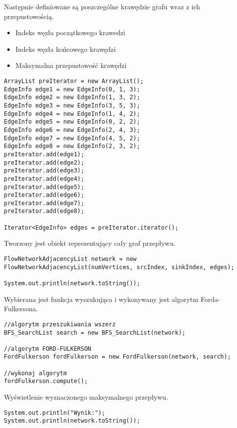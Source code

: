 \documentclass[10pt]{dokument-tiwo}
\begin{document}
Następnie definiowane są poszczególne krawędzie grafu wraz z ich przepustowością.
\begin{itemize}
\item Indeks węzła początkowego krawedzi
\item Indeks węzła końcowego krawędzi
\item Maksymalna przepustowość krawędzi
\end{itemize}
\begin{lstlisting}
ArrayList preIterator = new ArrayList();
EdgeInfo edge1 = new EdgeInfo(0, 1, 3);
EdgeInfo edge2 = new EdgeInfo(1, 3, 2);
EdgeInfo edge3 = new EdgeInfo(3, 5, 3);
EdgeInfo edge4 = new EdgeInfo(1, 4, 2);
EdgeInfo edge5 = new EdgeInfo(0, 2, 2);
EdgeInfo edge6 = new EdgeInfo(2, 4, 3);
EdgeInfo edge7 = new EdgeInfo(4, 5, 2);
EdgeInfo edge8 = new EdgeInfo(2, 3, 2);
preIterator.add(edge1);
preIterator.add(edge2);
preIterator.add(edge3);
preIterator.add(edge4);
preIterator.add(edge5);
preIterator.add(edge6);
preIterator.add(edge7);
preIterator.add(edge8);

Iterator<EdgeInfo> edges = preIterator.iterator();
\end{lstlisting}

Tworzony jest obiekt reprezentujący cały graf przepływu.
\begin{lstlisting}
FlowNetworkAdjacencyList network = new FlowNetworkAdjacencyList(numVertices, srcIndex, sinkIndex, edges);

System.out.println(network.toString());
\end{lstlisting}

Wybierana jest funkcja wyszukująca i wykonywany jest algorytm Forda-Fulkersona.
\begin{lstlisting}
//algorytm przeszukiwania wszerz
BFS_SearchList search = new BFS_SearchList(network);

//algorytm FORD-FULKERSON
FordFulkerson fordFulkerson = new FordFulkerson(network, search);

//wykonaj algorytm
fordFulkerson.compute();
\end{lstlisting}

Wyświetlenie wyznaczonego maksymalnego przepływu.
\begin{lstlisting}
System.out.println("Wynik:");
System.out.println(network.toString());
\end{lstlisting}
\end{document}
